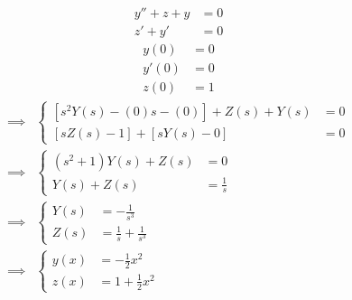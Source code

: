 \documentclass[11pt,a4paper,titlepage,final]{article}
\begin{document}
\begin{exercise*}{12.15}
	\begin{align*}
	y''+z+y &= 0 \\
	z'+y' &= 0
	\end{align*}
	\begin{align*}
	y(0) &= 0 \\ y'(0) &= 0 \\ z(0)&=1
	\end{align*}
	\tcblower
	\begin{align*}
	\implies& \begin{cases}
	\left[s^2Y(s)-(0)s-(0)\right] + Z(s) + Y(s) &= 0 \\
	\left[sZ(s)-1\right]+\left[sY(s)-0\right] &= 0
	\end{cases}
	\\ \implies & \begin{cases}
	(s^2+1)Y(s)+Z(s) &= 0\\
	Y(s) + Z(s) &= \frac{1}{s}
	\end{cases}
	\\ \implies & \begin{cases}
	Y(s) &= -\frac{1}{s^3} \\
	Z(s) &= \frac{1}{s} + \frac{1}{s^3}
	\end{cases} \\ \implies & \begin{cases}
	y(x) &= -\frac{1}{2}x^2 \\
	z(x) &= 1 + \frac{1}{2}x^2
	\end{cases}
	\end{align*}
\end{exercise*}
\end{document}
